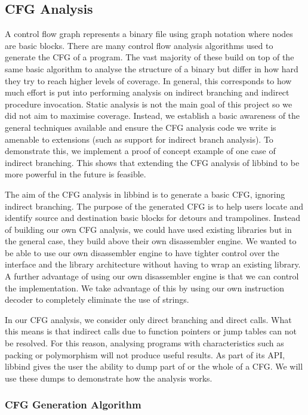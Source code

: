 \subsection{CFG Analysis}

A control flow graph represents a binary file using graph notation where nodes are basic blocks. There are many control flow analysis algorithms used to generate the CFG of a program. The vast majority of these build on top of the same basic algorithm to analyse the structure of a binary but differ in how hard they try to reach higher levels of coverage. In general, this corresponds to how much effort is put into performing analysis on indirect branching and indirect procedure invocation\cite{cfg}. Static analysis is not the main goal of this project so we did not aim to maximise coverage. Instead, we establish a basic awareness of the general techniques available and ensure the CFG analysis code we write is amenable to extensions (such as support for indirect branch analysis). To demonstrate this, we implement a proof of concept example of one case of indirect branching. This shows that extending the CFG analysis of libbind to be more powerful in the future is feasible.

The aim of the CFG analysis in libbind is to generate a basic CFG, ignoring indirect branching. The purpose of the generated CFG is to help users locate and identify source and destination basic blocks for detours and trampolines. Instead of building our own CFG analysis, we could have used existing libraries but in the general case, they build above their own disassembler engine. We wanted to be able to use our own disassembler engine to have tighter control over the interface and the library architecture without having to wrap an existing library. A further advantage of using our own disassembler engine is that we can control the implementation. We take advantage of this by using our own instruction decoder to completely eliminate the use of strings.

In our CFG analysis, we consider only direct branching and direct calls. What this means is that indirect calls due to function pointers or jump tables can not be resolved. For this reason, analysing programs with characteristics such as packing or polymorphism will not produce useful results. As part of its API, libbind gives the user the ability to dump part of or the whole of a CFG. We will use these dumps to demonstrate how the analysis works.

\subsubsection{CFG Generation Algorithm}

